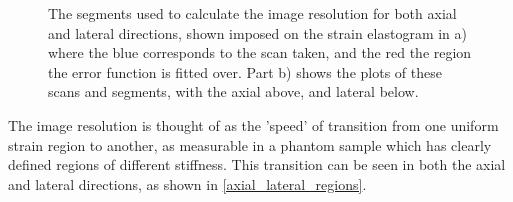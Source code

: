 \begin{figure}[t]
\begin{subfigure}{0.49\textwidth}
	\end{subfigure}
	\caption{The segments used to calculate the image resolution for both axial and lateral directions, shown imposed on the strain elastogram in a) where the blue corresponds to the scan taken, and the red the region the error function is fitted over. Part b) shows the plots of these scans and segments, with the axial above, and lateral below.}
	\label{axial_lateral_regions}	
\end{figure}

The image resolution is thought of as the 'speed' of transition from one uniform strain region to another, as measurable in a phantom sample which has clearly defined regions of different stiffness. This transition can be seen in both the axial and lateral directions, as shown in \autoref{axial_lateral_regions}.

